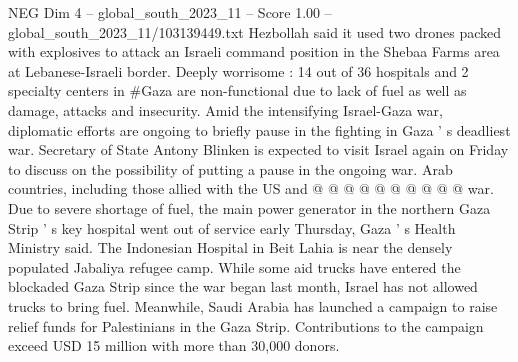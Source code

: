 \begin{textsample}{NEG Dim 4 – global\_south\_2023\_11 – Score 1.00 – global\_south\_2023\_11/103139449.txt}
Hezbollah said it used two drones packed with explosives to attack an Israeli command position in the Shebaa Farms area at Lebanese-Israeli border.
Deeply worrisome : 14 out of 36 hospitals and 2 specialty centers in \#Gaza are non-functional due to lack of fuel as well as damage, attacks and insecurity.
Amid the intensifying Israel-Gaza war, diplomatic efforts are ongoing to briefly pause in the fighting in Gaza ' s deadliest war.
Secretary of State Antony Blinken is expected to visit Israel again on Friday to discuss on the possibility of putting a pause in the ongoing war.
Arab countries, including those allied with the US and @ @ @ @ @ @ @ @ @ @ war.
Due to severe shortage of fuel, the main power generator in the northern Gaza Strip ' s key hospital went out of service early Thursday, Gaza ' s Health Ministry said.
The Indonesian Hospital in Beit Lahia is near the densely populated Jabaliya refugee camp.
While some aid trucks have entered the blockaded Gaza Strip since the war began last month, Israel has not allowed trucks to bring fuel.
Meanwhile, Saudi Arabia has launched a campaign to raise relief funds for Palestinians in the Gaza Strip.
Contributions to the campaign exceed USD 15 million with more than 30,000 donors.

\end{textsample}
